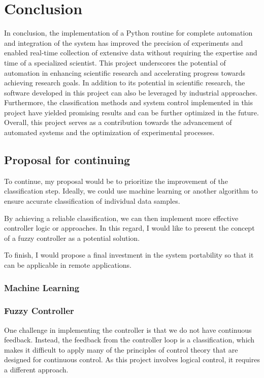 \chapter{Conclusion}
\label{chap:conclusion}

In conclusion, the implementation of a Python routine for complete automation and integration of the system has improved the precision of experiments and enabled real-time collection of extensive data without requiring the expertise and time of a specialized scientist. 
This project underscores the potential of automation in enhancing scientific research and accelerating progress towards achieving research goals.
In addition to its potential in scientific research, the software developed in this project can also be leveraged by industrial approaches. 
Furthermore, the classification methods and system control implemented in this project have yielded promising results and can be further optimized in the future. Overall, this project serves as a contribution towards the advancement of automated systems and the optimization of experimental processes.

\section{Proposal for continuing}

To continue, my proposal would be to prioritize the improvement of the classification step. 
Ideally, we could use machine learning or another algorithm to ensure accurate classification of individual data samples.

By achieving a reliable classification, we can then implement more effective controller logic or approaches. 
In this regard, I would like to present the concept of a fuzzy controller as a potential solution.

To finish, I would propose a final investment in the system portability so that it can be applicable in remote applications.

\subsection{Machine Learning}

\subsection{Fuzzy Controller}

        One challenge in implementing the controller is that we do not have continuous feedback. 
        Instead, the feedback from the controller loop is a classification, which makes it difficult to apply many of the principles of control theory that are designed for continuous control. 
        As this project involves logical control, it requires a different approach. 
        
